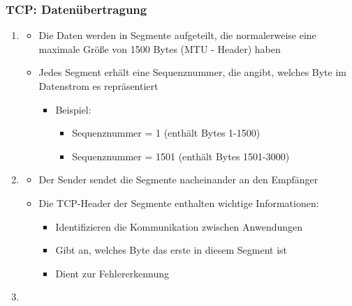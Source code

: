 \subsubsection*{TCP: Datenübertragung}
\begin{infoBox}[title=Ablauf der Datenübertragung]
    \begin{enumerate}
        \item {}
        \begin{itemize}
            \item Die Daten werden in Segmente aufgeteilt, die normalerweise eine maximale Größe von 1500 Bytes (MTU - Header) haben
            \item Jedes Segment erhält eine Sequenznummer, die angibt, welches Byte im Datenstrom es repräsentiert
            \begin{itemize}
                \item Beispiel:
                \begin{itemize}
                    \item {} Sequenznummer = 1 (enthält Bytes 1-1500)
                    \item {} Sequenznummer = 1501 (enthält Bytes 1501-3000)
                \end{itemize}
            \end{itemize}
        \end{itemize}
        \item {}
        \begin{itemize}
            \item Der Sender sendet die Segmente nacheinander an den Empfänger
            \item Die TCP-Header der Segmente enthalten wichtige Informationen:
            \begin{itemize}
                \item {} Identifizieren die Kommunikation zwischen Anwendungen
                \item {} Gibt an, welches Byte das erste in diesem Segment ist
                \item {} Dient zur Fehlererkennung
            \end{itemize}
        \end{itemize}
        \item {}
        \begin{itemize}

\end{itemize}
\end{enumerate}
\end{infoBox}
